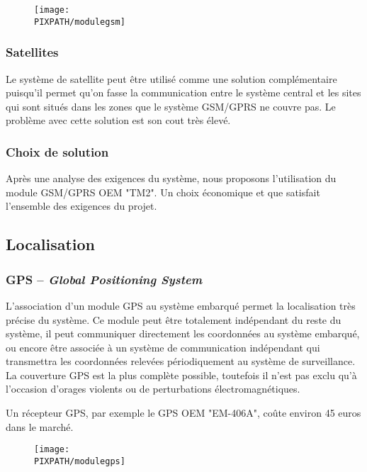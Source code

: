     \begin{figure}[!h]
    \begin{center}
    \texttt{[image: \\PIXPATH/modulegsm]}
    \caption{}
    \end{center}
    \end{figure}


\subsubsection{Satellites}

Le système de satellite peut être utilisé comme une solution complémentaire puisqu'il permet qu'on fasse la communication entre le système central et les sites qui sont situés dans les zones que le système GSM/GPRS ne couvre pas.
Le problème avec cette solution est son cout  très élevé.

\subsubsection{Choix de solution}
Après une analyse des exigences du système, nous proposons l’utilisation du module GSM/GPRS OEM "TM2". Un choix économique et que satisfait l’ensemble des exigences du projet.

\subsection{Localisation}

\subsubsection{GPS – \textsl{Global Positioning System}}

L’association d’un module GPS au système embarqué permet la localisation très précise du système. Ce module peut être totalement indépendant du reste du système, il peut communiquer directement les coordonnées au système embarqué, ou encore être associée à un système de communication indépendant qui transmettra les coordonnées relevées périodiquement au système de surveillance.
La couverture GPS est la plus complète possible, toutefois il n’est pas exclu qu’à l’occasion d’orages violents ou de perturbations électromagnétiques.

Un récepteur GPS, par exemple le GPS OEM "EM-406A", coûte environ 45 euros dans le marché. 

    \begin{figure}[!h]
    \begin{center}
    \texttt{[image: \\PIXPATH/modulegps]}
    \caption{}
    \end{center}
    \end{figure}
	

